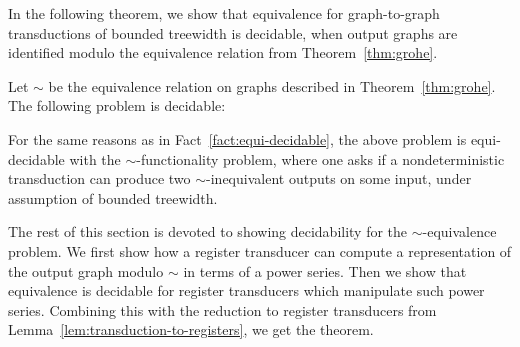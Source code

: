 In the following theorem, we show that equivalence for graph-to-graph \mso transductions of bounded treewidth is decidable, when output graphs are identified modulo the equivalence relation from Theorem~\ref{thm:grohe}. 
\begin{theorem}\label{thm:path-equivalence}
    Let $\sim$ be the equivalence relation on graphs described in Theorem~\ref{thm:grohe}. 
    The following problem is decidable:
\end{theorem}
 
For the same reasons as in Fact~\ref{fact:equi-decidable}, the above problem is equi-decidable with the $\sim$-functionality problem, where one asks if a nondeterministic transduction can produce two $\sim$-inequivalent outputs on some input, under assumption of bounded treewidth. 

The rest of this section is devoted to showing decidability for the  $\sim$-equivalence problem. We first show how a register transducer can compute a representation of the output graph modulo $\sim$ in terms of a power series. Then we show that equivalence is decidable for register transducers which manipulate such power series. Combining this with the reduction to register transducers from Lemma~\ref{lem:transduction-to-registers}, we get the theorem.

